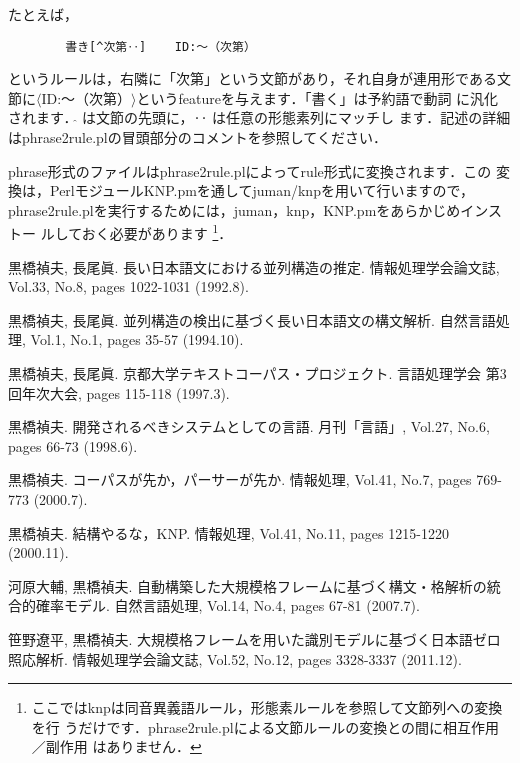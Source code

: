 \documentclass[a4j,11pt,titlepage]{jarticle}
\def\fl{$\langle$}
\def\fr{$\rangle$}
\begin{document}
たとえば，
\begin{verbatim}
        書き[^次第‥]    ID:〜（次第）
\end{verbatim}
というルールは，右隣に「次第」という文節があり，それ自身が連用形である文
節に\fl ID:〜（次第）\fr というfeatureを与えます．「書く」は予約語で動詞
に汎化されます．$\hat{ }$ は文節の先頭に，‥ は任意の形態素列にマッチし
ます．記述の詳細はphrase2rule.plの冒頭部分のコメントを参照してください．

phrase形式のファイルはphrase2rule.plによってrule形式に変換されます．この
変換は，PerlモジュールKNP.pmを通してjuman/knpを用いて行いますので，
phrase2rule.plを実行するためには，juman，knp，KNP.pmをあらかじめインストー
ルしておく必要があります
\footnote{
ここではknpは同音異義語ルール，形態素ルールを参照して文節列への変換を行
うだけです．phrase2rule.plによる文節ルールの変換との間に相互作用／副作用
はありません．}．

\begin{thebibliography}{}

黒橋禎夫, 長尾眞.
\newblock 長い日本語文における並列構造の推定.
\newblock 情報処理学会論文誌, Vol.33, No.8, pages 1022-1031 (1992.8).

黒橋禎夫, 長尾眞.
\newblock 並列構造の検出に基づく長い日本語文の構文解析.
\newblock 自然言語処理, Vol.1, No.1, pages 35-57 (1994.10).

黒橋禎夫, 長尾眞.
\newblock 京都大学テキストコーパス・プロジェクト.
\newblock 言語処理学会 第3回年次大会, pages 115-118 (1997.3).

黒橋禎夫.
\newblock 開発されるべきシステムとしての言語.
\newblock 月刊「言語」, Vol.27, No.6, pages 66-73 (1998.6).

黒橋禎夫.
\newblock コーパスが先か，パーサーが先か.
\newblock 情報処理, Vol.41, No.7, pages 769-773 (2000.7).

黒橋禎夫.
\newblock 結構やるな，KNP.
\newblock 情報処理, Vol.41, No.11, pages 1215-1220 (2000.11).

河原大輔, 黒橋禎夫.
\newblock 自動構築した大規模格フレームに基づく構文・格解析の統合的確率モデル.
\newblock 自然言語処理, Vol.14, No.4, pages 67-81 (2007.7).

笹野遼平, 黒橋禎夫. 
\newblock 大規模格フレームを用いた識別モデルに基づく日本語ゼロ照応解析.
\newblock 情報処理学会論文誌, Vol.52, No.12, pages 3328-3337 (2011.12).

\end{thebibliography}
\end{document}
